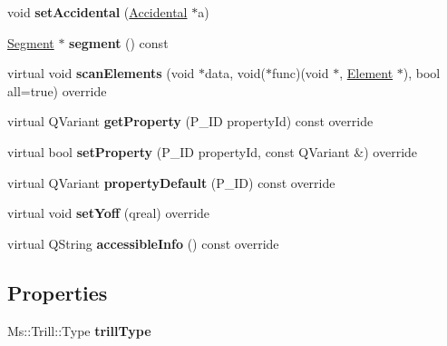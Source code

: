 \begin{DoxyCompactItemize}
\item 
\mbox{\label{class_ms_1_1_trill_a8b2c77fe2420148e153b82af0ec6cc0a}} 
void {\bfseries set\+Accidental} (\hyperlink{class_ms_1_1_accidental}{Accidental} $\ast$a)
\item 
\mbox{\label{class_ms_1_1_trill_aaaaae1d1c7ad80e72ba38209f3eb5863}} 
\hyperlink{class_ms_1_1_segment}{Segment} $\ast$ {\bfseries segment} () const
\item 
\mbox{\label{class_ms_1_1_trill_a5f1acb02131bf7607a1631660ef988e0}} 
virtual void {\bfseries scan\+Elements} (void $\ast$data, void($\ast$func)(void $\ast$, \hyperlink{class_ms_1_1_element}{Element} $\ast$), bool all=true) override
\item 
\mbox{\label{class_ms_1_1_trill_a13de484bf569ac9e8d5e7562251f8e28}} 
virtual Q\+Variant {\bfseries get\+Property} (P\+\_\+\+ID property\+Id) const override
\item 
\mbox{\label{class_ms_1_1_trill_a80abc0ae953d12527bab6d5e6e7c884b}} 
virtual bool {\bfseries set\+Property} (P\+\_\+\+ID property\+Id, const Q\+Variant \&) override
\item 
\mbox{\label{class_ms_1_1_trill_acd18ff4965c39ca807122ebfe802a4e6}} 
virtual Q\+Variant {\bfseries property\+Default} (P\+\_\+\+ID) const override
\item 
\mbox{\label{class_ms_1_1_trill_a974a279a6d144dbefd5dea5b26370812}} 
virtual void {\bfseries set\+Yoff} (qreal) override
\item 
\mbox{\label{class_ms_1_1_trill_a42a87721dc691618e9eb18a719e5ae39}} 
virtual Q\+String {\bfseries accessible\+Info} () const override
\end{DoxyCompactItemize}
\subsection*{Properties}
\begin{DoxyCompactItemize}
\item 
\mbox{\label{class_ms_1_1_trill_a896237ce00a0cced38550d96e8029a80}} 
Ms\+::\+Trill\+::\+Type {\bfseries trill\+Type}
\end{DoxyCompactItemize}
